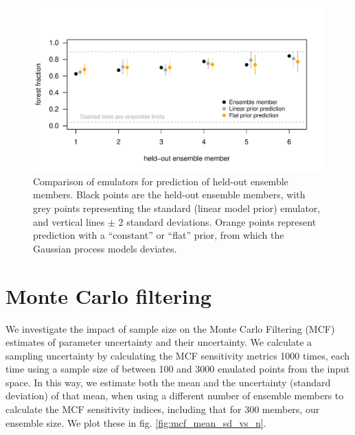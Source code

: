 \documentclass[gmd, manuscript]{copernicus} %
\begin{document}
\begin{figure}[t]
\includegraphics[width=12cm]{../graphics/loo_v_holdout_flat_prediction_error.pdf}
\caption{Comparison of emulators for prediction of held-out ensemble members. Black points are the held-out ensemble members, with grey points representing the standard (linear model prior) emulator, and vertical lines $\pm$ 2 standard deviations. Orange points represent prediction with a ``constant'' or ``flat'' prior, from which the Gaussian process models deviates.}
\label{fig:loo_v_holdout_flat_prediction_error}
\end{figure}


\section{Monte Carlo filtering}

We investigate the impact of sample size on the Monte Carlo Filtering (MCF) estimates of parameter uncertainty and their uncertainty. We calculate a sampling uncertainty by calculating the MCF sensitivity metrics 1000 times, each time using a sample size of between 100 and 3000 emulated points from the input space. In this way, we estimate both the mean and the uncertainty (standard deviation) of that mean, when using a different number of ensemble members to calculate the MCF sensitivity indices, including that for 300 members, our ensemble size. We plot these in fig. \ref{fig:mcf_mean_sd_vs_n}.
\end{document}
